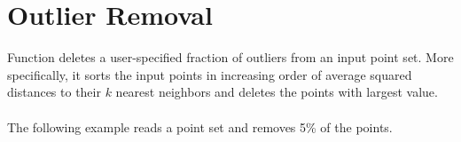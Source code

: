 \section{Outlier Removal}

Function  deletes a user-specified fraction of outliers from an input point set. More specifically, it sorts the input points in increasing order of average squared distances to their $k$ nearest neighbors and deletes the points with largest value. %
\\
  \\




The following example reads a point set and removes 5\% of the points.
